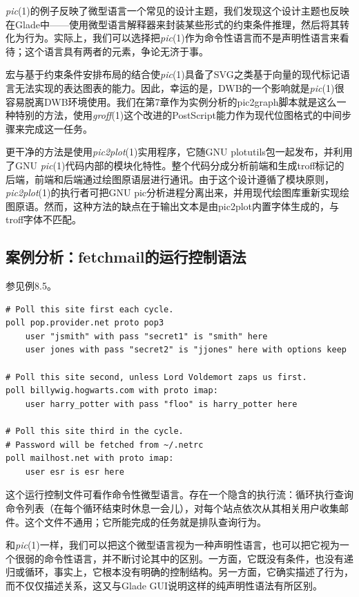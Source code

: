 \documentclass[12pt,oneside]{book}
\begin{document}
\textit{pic}(1)的例子反映了微型语言一个常见的设计主题，我们发现这个设计主题也反映在Glade中——使用微型语言解释器来封装某些形式的约束条件推理，然后将其转化为行为。实际上，我们可以选择把\textit{pic}(1)作为命令性语言而不是声明性语言来看待；这个语言具有两者的元素，争论无济于事。

宏与基于约束条件安排布局的结合使\textit{pic}(1)具备了SVG之类基于向量的现代标记语言无法实现的表达图表的能力。因此，幸运的是，DWB的一个影响就是\textit{pic}(1)很容易脱离DWB环境使用。我们在第7章作为实例分析的pic2graph脚本就是这么一种特别的方法，使用\textit{groff}(1)这个改进的PostScript能力作为现代位图格式的中间步骤来完成这一任务。

更干净的方法是使用\textit{pic2plot}(1)实用程序，它随GNU plotutils包一起发布，并利用了GNU \textit{pic}(1)代码内部的模块化特性。整个代码分成分析前端和生成troff标记的后端，前端和后端通过绘图原语层进行通讯。由于这个设计遵循了模块原则，\textit{pic2plot}(1)的执行者可把GNU pic分析进程分离出来，并用现代绘图库重新实现绘图原语。然而，这种方法的缺点在于输出文本是由pic2plot内置字体生成的，与troff字体不匹配。

\subsection{案例分析：fetchmail的运行控制语法}
参见例8.5。
\begin{Verbatim}[label=例8.5 fetchmailrc的假想例子]
# Poll this site first each cycle.
poll pop.provider.net proto pop3
    user "jsmith" with pass "secret1" is "smith" here
    user jones with pass "secret2" is "jjones" here with options keep

# Poll this site second, unless Lord Voldemort zaps us first.
poll billywig.hogwarts.com with proto imap:
    user harry_potter with pass "floo" is harry_potter here

# Poll this site third in the cycle.  
# Password will be fetched from ~/.netrc
poll mailhost.net with proto imap:
    user esr is esr here
\end{Verbatim}

这个运行控制文件可看作命令性微型语言。存在一个隐含的执行流：循环执行查询命令列表（在每个循环结束时休息一会儿），对每个站点依次从其相关用户收集邮件。这个文件不通用；它所能完成的任务就是排队查询行为。

和\textit{pic}(1)一样，我们可以把这个微型语言视为一种声明性语言，也可以把它视为一个很弱的命令性语言，并不断讨论其中的区别。一方面，它既没有条件，也没有递归或循环，事实上，它根本没有明确的控制结构。另一方面，它确实描述了行为，而不仅仅描述关系，这又与Glade GUI说明这样的纯声明性语法有所区别。
\end{document}
